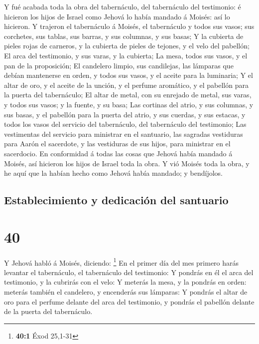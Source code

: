  Y fué acabada toda la obra del tabernáculo, del
tabernáculo del testimonio: é hicieron los hijos de Israel como Jehová
lo había mandado á Moisés: así lo hicieron.  Y trajeron
el tabernáculo á Moisés, el tabernáculo y todos sus vasos; sus
corchetes, sus tablas, sus barras, y sus columnas, y sus basas;
 Y la cubierta de pieles rojas de carneros, y la cubierta
de pieles de tejones, y el velo del pabellón;  El arca
del testimonio, y sus varas, y la cubierta;  La mesa,
todos sus vasos, y el pan de la proposición;  El
candelero limpio, sus candilejas, las lámparas que debían mantenerse en
orden, y todos sus vasos, y el aceite para la luminaria; 
Y el altar de oro, y el aceite de la unción, y el perfume aromático, y
el pabellón para la puerta del tabernáculo;  El altar de
metal, con su enrejado de metal, sus varas, y todos sus vasos; y la
fuente, y su basa;  Las cortinas del atrio, y sus
columnas, y sus basas, y el pabellón para la puerta del atrio, y sus
cuerdas, y sus estacas, y todos los vasos del servicio del tabernáculo,
del tabernáculo del testimonio;  Las vestimentas del
servicio para ministrar en el santuario, las sagradas vestiduras para
Aarón el sacerdote, y las vestiduras de sus hijos, para ministrar en el
sacerdocio.  En conformidad á todas las cosas que Jehová
había mandado á Moisés, así hicieron los hijos de Israel toda la obra.
 Y vió Moisés toda la obra, y he aquí que la habían hecho
como Jehová había mandado; y bendíjolos.

\hypertarget{establecimiento-y-dedicaciuxf3n-del-santuario}{%
\subsection{Establecimiento y dedicación del
santuario}\label{establecimiento-y-dedicaciuxf3n-del-santuario}}

\hypertarget{section-39}{%
\section{40}\label{section-39}}

 Y Jehová habló á Moisés, diciendo: \footnote{\textbf{40:1}
  Éxod 25,1-31}  En el primer día del mes primero harás
levantar el tabernáculo, el tabernáculo del testimonio:  Y
pondrás en él el arca del testimonio, y la cubrirás con el velo:
 Y meterás la mesa, y la pondrás en orden: meterás también
el candelero, y encenderás sus lámparas:  Y pondrás el
altar de oro para el perfume delante del arca del testimonio, y pondrás
el pabellón delante de la puerta del tabernáculo.

